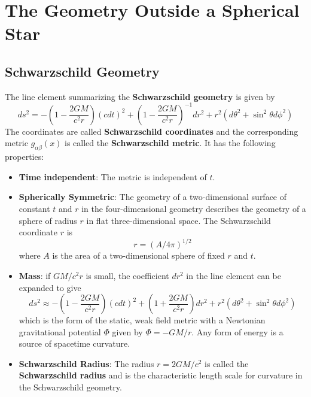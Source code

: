 %
%
%
\chapter{The Geometry Outside a Spherical Star}
\label{GeomSphere} %




\section{Schwarzschild Geometry}
\label{sec:schwarz}

The line element summarizing the \textbf{Schwarzschild geometry} is given by $$ds^2 = -\left(1-\frac{2GM}{c^2r}\right)(cdt)^2+\left(1-\frac{2GM}{c^2r}\right)^{-1}dr^2+r^2(d\theta^2+\sin^2\theta d\phi^2)$$
The coordinates are called \textbf{Schwarzschild coordinates} and the corresponding metric $g_{\alpha\beta}(x)$ is called the \textbf{Schwarzschild metric}. It has the following properties: \begin{itemize}
    \item \textbf{Time independent}: The metric is independent of $t$.
    \item \textbf{Spherically Symmetric}: The geometry of a two-dimensional surface of constant $t$ and $r$ in the four-dimensional geometry describes the geometry of a sphere of radius $r$ in flat three-dimensional space. The Schwarzschild coordinate $r$ is $$r = (A/4\pi)^{1/2}$$
        where $A$ is the area of a two-dimensional sphere of fixed $r$ and $t$.
    \item \textbf{Mass}: if $GM/c^2r$ is small, the coefficient $dr^2$ in the line element can be expanded to give $$ds^2 \approx -\left(1-\frac{2GM}{c^2r}\right)(cdt)^2+\left(1+\frac{2GM}{c^2r}\right)dr^2+r^2(d\theta^2+\sin^2\theta d\phi^2)$$
        which is the form of the static, weak field metric with a Newtonian gravitational potential $\Phi$ given by $\Phi = -GM/r$. Any form of energy is a source of spacetime curvature. 
    \item \textbf{Schwarzschild Radius}: The radius $r  = 2GM/c^2$ is called the \textbf{Schwarzschild radius} and is the characteristic length scale for curvature in the Schwarzschild geometry.
\end{itemize}

